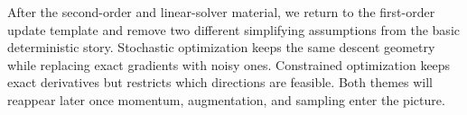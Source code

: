 After the second-order and linear-solver material, we return to the first-order update template and remove two different simplifying assumptions from the basic deterministic story.
Stochastic optimization keeps the same descent geometry while replacing exact gradients with noisy ones.
Constrained optimization keeps exact derivatives but restricts which directions are feasible.
Both themes will reappear later once momentum, augmentation, and sampling enter the picture.



